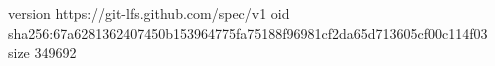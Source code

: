 version https://git-lfs.github.com/spec/v1
oid sha256:67a6281362407450b153964775fa75188f96981cf2da65d713605cf00c114f03
size 349692
